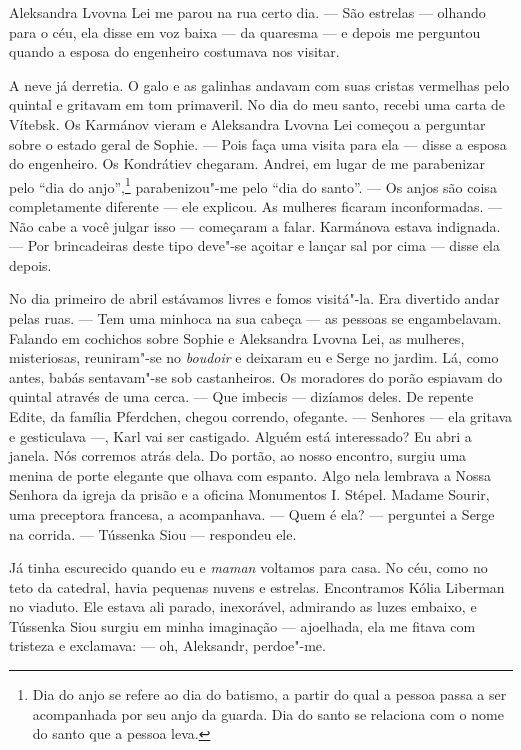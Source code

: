 Aleksandra Lvovna Lei me parou na rua certo dia. --- São estrelas ---
olhando para o céu, ela disse em voz baixa --- da quaresma --- e depois
me perguntou quando a esposa do engenheiro costumava nos visitar.

A neve já derretia. O galo e as galinhas andavam com suas cristas
vermelhas pelo quintal e gritavam em tom primaveril. No dia do meu
santo, recebi uma carta de Vítebsk. Os Karmánov vieram e Aleksandra
Lvovna Lei começou a perguntar sobre o estado geral de Sophie. --- Pois
faça uma visita para ela --- disse a esposa do engenheiro. Os Kondrátiev
chegaram. Andrei, em lugar de me parabenizar pelo ``dia do
anjo'',\footnote{Dia do anjo se refere ao dia do batismo, a partir do
  qual a pessoa passa a ser acompanhada por seu anjo da guarda. Dia do
  santo se relaciona com o nome do santo que a pessoa leva.}
parabenizou"-me pelo ``dia do santo''. --- Os anjos são coisa
completamente diferente --- ele explicou. As mulheres ficaram
inconformadas. --- Não cabe a você julgar isso --- começaram a falar.
Karmánova estava indignada. --- Por brincadeiras deste tipo deve"-se
açoitar e lançar sal por cima --- disse ela depois.

No dia primeiro de abril estávamos livres e fomos visitá"-la. Era
divertido andar pelas ruas. --- Tem uma minhoca na sua cabeça --- as
pessoas se engambelavam. Falando em cochichos sobre Sophie e Aleksandra
Lvovna Lei, as mulheres, misteriosas, reuniram"-se no \emph{boudoir} e
deixaram eu e Serge no jardim. Lá, como antes, babás sentavam"-se sob
castanheiros. Os moradores do porão espiavam do quintal através de uma
cerca. --- Que imbecis --- dizíamos deles. De repente Edite, da família
Pferdchen, chegou correndo, ofegante. --- Senhores --- ela gritava e
gesticulava ---, Karl vai ser castigado. Alguém está interessado? Eu
abri a janela. Nós corremos atrás dela. Do portão, ao nosso encontro,
surgiu uma menina de porte elegante que olhava com espanto. Algo nela
lembrava a Nossa Senhora da igreja da prisão e a oficina Monumentos I.
Stépel. Madame Sourir, uma preceptora francesa, a acompanhava. --- Quem
é ela? --- perguntei a Serge na corrida. --- Tússenka Siou --- respondeu
ele.

Já tinha escurecido quando eu e \emph{maman} voltamos para casa. No céu,
como no teto da catedral, havia pequenas nuvens e estrelas. Encontramos
Kólia Liberman no viaduto. Ele estava ali parado, inexorável, admirando
as luzes embaixo, e Tússenka Siou surgiu em minha imaginação ---
ajoelhada, ela me fitava com tristeza e exclamava: --- oh, Aleksandr,
perdoe"-me.

